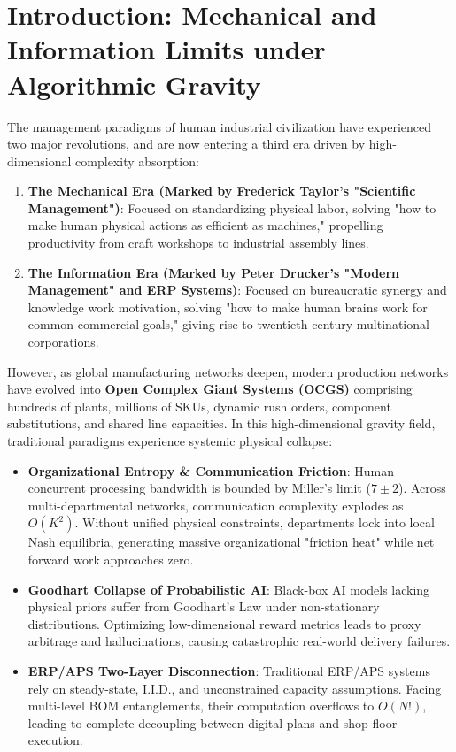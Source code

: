 \documentclass[11pt,a4paper]{article}
\begin{document}
\newpage
\tableofcontents
\newpage

\section{Introduction: Mechanical and Information Limits under Algorithmic Gravity}

The management paradigms of human industrial civilization have experienced two major revolutions, and are now entering a third era driven by high-dimensional complexity absorption:
\begin{enumerate}
    \item \textbf{The Mechanical Era (Marked by Frederick Taylor's "Scientific Management")}: Focused on standardizing physical labor, solving "how to make human physical actions as efficient as machines," propelling productivity from craft workshops to industrial assembly lines.
    \item \textbf{The Information Era (Marked by Peter Drucker's "Modern Management" and ERP Systems)}: Focused on bureaucratic synergy and knowledge work motivation, solving "how to make human brains work for common commercial goals," giving rise to twentieth-century multinational corporations.
\end{enumerate}

However, as global manufacturing networks deepen, modern production networks have evolved into \textbf{Open Complex Giant Systems (OCGS)} comprising hundreds of plants, millions of SKUs, dynamic rush orders, component substitutions, and shared line capacities. In this high-dimensional gravity field, traditional paradigms experience systemic physical collapse:
\begin{itemize}
    \item \textbf{Organizational Entropy & Communication Friction}: Human concurrent processing bandwidth is bounded by Miller's limit ($7 \pm 2$). Across multi-departmental networks, communication complexity explodes as $O(K^2)$. Without unified physical constraints, departments lock into local Nash equilibria, generating massive organizational "friction heat" while net forward work approaches zero.
    \item \textbf{Goodhart Collapse of Probabilistic AI}: Black-box AI models lacking physical priors suffer from Goodhart's Law under non-stationary distributions. Optimizing low-dimensional reward metrics leads to proxy arbitrage and hallucinations, causing catastrophic real-world delivery failures.
    \item \textbf{ERP/APS Two-Layer Disconnection}: Traditional ERP/APS systems rely on steady-state, I.I.D., and unconstrained capacity assumptions. Facing multi-level BOM entanglements, their computation overflows to $O(N!)$, leading to complete decoupling between digital plans and shop-floor execution.
\end{itemize}
\end{document}
